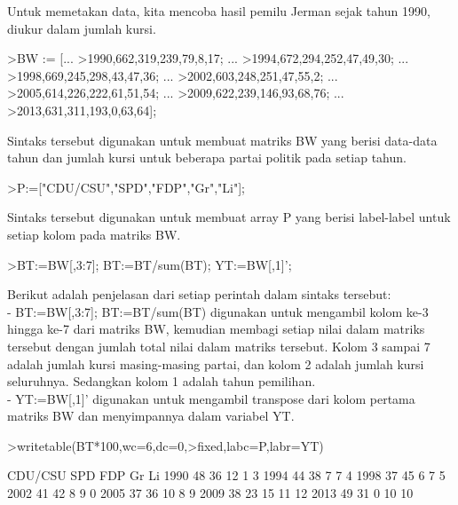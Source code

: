 \documentclass[a4paper,10pt]{article}
\begin{document}
\begin{eulernotebook}
\begin{eulercomment}
\begin{eulercomment}
\begin{eulercomment}
\begin{eulercomment}
\begin{eulercomment}
\begin{eulercomment}
\begin{eulercomment}
\begin{eulercomment}
\begin{eulercomment}
\begin{eulercomment}
\begin{eulercomment}
\begin{eulercomment}
\begin{eulercomment}
\begin{eulercomment}
\begin{eulercomment}
\begin{eulercomment}
\begin{eulercomment}
Untuk memetakan data, kita mencoba hasil pemilu Jerman sejak tahun
1990, diukur dalam jumlah kursi.
\end{eulercomment}
\begin{eulerprompt}
>BW := [...
>1990,662,319,239,79,8,17; ...
>1994,672,294,252,47,49,30; ...
>1998,669,245,298,43,47,36; ...
>2002,603,248,251,47,55,2; ...
>2005,614,226,222,61,51,54; ...
>2009,622,239,146,93,68,76; ...
>2013,631,311,193,0,63,64];
\end{eulerprompt}
\begin{eulercomment}
Sintaks tersebut digunakan untuk membuat matriks BW yang berisi
data-data tahun dan jumlah kursi untuk beberapa partai politik pada
setiap tahun.
\end{eulercomment}
\begin{eulerprompt}
>P:=["CDU/CSU","SPD","FDP","Gr","Li"];
\end{eulerprompt}
\begin{eulercomment}
Sintaks tersebut digunakan untuk membuat array P yang berisi
label-label untuk setiap kolom pada matriks BW.
\end{eulercomment}
\begin{eulerprompt}
>BT:=BW[,3:7]; BT:=BT/sum(BT); YT:=BW[,1]';
\end{eulerprompt}
\begin{eulercomment}
Berikut adalah penjelasan dari setiap perintah dalam sintaks tersebut:\\
- BT:=BW[,3:7]; BT:=BT/sum(BT) digunakan untuk mengambil kolom ke-3
hingga ke-7 dari matriks BW, kemudian membagi setiap nilai dalam
matriks tersebut dengan jumlah total nilai dalam matriks tersebut.
Kolom 3 sampai 7 adalah jumlah kursi masing-masing partai, dan kolom 2
adalah jumlah kursi seluruhnya. Sedangkan kolom 1 adalah tahun
pemilihan.\\
- YT:=BW[,1]' digunakan untuk mengambil transpose dari kolom pertama
matriks BW dan menyimpannya dalam variabel YT.
\end{eulercomment}
\begin{eulerprompt}
>writetable(BT*100,wc=6,dc=0,>fixed,labc=P,labr=YT)
\end{eulerprompt}
\begin{euleroutput}
         CDU/CSU   SPD   FDP    Gr    Li
    1990      48    36    12     1     3
    1994      44    38     7     7     4
    1998      37    45     6     7     5
    2002      41    42     8     9     0
    2005      37    36    10     8     9
    2009      38    23    15    11    12
    2013      49    31     0    10    10

\end{euleroutput}
\end{eulercomment}
\end{eulercomment}
\end{eulercomment}
\end{eulercomment}
\end{eulercomment}
\end{eulercomment}
\end{eulercomment}
\end{eulercomment}
\end{eulercomment}
\end{eulercomment}
\end{eulercomment}
\end{eulercomment}
\end{eulercomment}
\end{eulercomment}
\end{eulercomment}
\end{eulercomment}
\end{eulernotebook}
\end{document}
